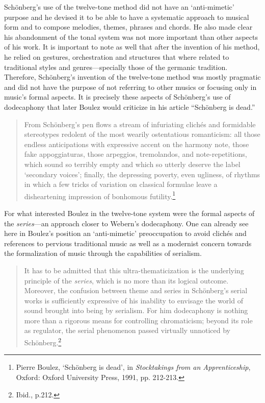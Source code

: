 Sch\"{o}nberg's use of the twelve-tone method did not have an `anti-mimetic' purpose and he devised it to be able to have a systematic approach to musical form and to compose melodies, themes, phrases and chords. He also made clear his abandonment of the tonal system was not more important than other aspects of his work. It is important to note as well that after the invention of his method, he relied on gestures, orchestration and structures that where related to traditional styles and genres---specially those of the germanic tradition. Therefore, Sch\"{o}nberg's invention of the twelve-tone method was mostly pragmatic and did not have the purpose of not referring to other musics or focusing only in music's formal aspects. It is precisely these aspects of Sch\"{o}nberg's use of dodecaphony that later Boulez would criticize in his article ``Sch\"{o}nberg is dead.''
\begin{quote}
From Sch\"{o}nberg's pen flows a stream of infuriating clich\'{e}s and formidable stereotypes redolent of the most wearily ostentatious romanticism: all those endless anticipations with expressive accent on the harmony note, those fake appoggiaturas, those arpeggios, tremolandos, and note-repetitions, which sound so terribly empty and which so utterly deserve the label `secondary voices'; finally, the depressing poverty, even ugliness, of rhythms in which a few tricks of variation on classical formulae leave a disheartening impression of bonhomous futility.\footnote{Pierre Boulez, `Sch\"{o}nberg is dead', in \emph{Stocktakings from an Apprenticeship}, Oxford: Oxford University Press, 1991, pp. 212-213.}
\end{quote}
For what interested Boulez in the twelve-tone system were the formal aspects of the \emph{series}---an approach closer to Webern's dodecaphony. One can already see here in Boulez's position an `anti-mimetic' preoccupation to avoid clich\'{e}s and references to pervious traditional music as well as a modernist concern towards the formalization of music through the capabilities of serialism.

\begin{quote}
It has to be admitted that this ultra-thematicization is the underlying principle of the \emph{series}, which is no more than its logical outcome. Moreover, the confusion between theme and series in Sch\"{o}nberg's serial works is sufficiently expressive of his inability to envisage the world of sound brought into being by serialism. For him dodecaphony is nothing more than a rigorous means for controlling chromaticism; beyond its role as regulator, the serial phenomenon passed virtually unnoticed by Sch\"{o}nberg.\footnote{Ibid., p.212.}
\end{quote}

